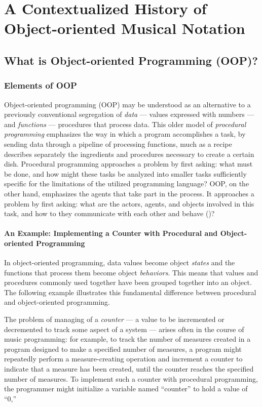 \chapter{A Contextualized History of Object-oriented Musical Notation}
\section{What is Object-oriented Programming (OOP)?}
\subsection{Elements of OOP}

Object-oriented programming (OOP) may be understood as an alternative to a previously conventional segregation of \emph{data} --- values expressed with numbers --- and \emph{functions} --- procedures that process data. This older model of \emph{procedural programming} emphasizes the way in which a program accomplishes a task, by sending data through a pipeline of processing functions, much as a recipe describes separately the ingredients and procedures necessary to create a certain dish. Procedural programming approaches a problem by first asking: what must be done, and how might these tasks be analyzed into smaller tasks sufficiently specific for the limitations of the utilized programming language? OOP, on the other hand, emphasizes the agents that take part in the process. It approaches a problem by first asking: what are the actors, agents, and objects involved in this task, and how to they communicate with each other and behave (\cite[5]{Wirfs-Brock:1990ys})?

\subsubsection{An Example: Implementing a Counter with Procedural and Object-oriented Programming}
In object-oriented programming, data values become object \emph{states} and the functions that process them become object \emph{behaviors}. This means that values and procedures commonly used together have been grouped together into an object. The following example illustrates this fundamental difference between procedural and object-oriented programming.

The problem of managing of a \emph{counter} --- a value to be incremented or decremented to track some aspect of a system --- arises often in the course of music programming: for example, to track the number of measures created in a program designed to make a specified number of measures, a program might repeatedly perform a measure-creating operation and increment a counter to indicate that a measure has been created, until the counter reaches the specified number of measures. To implement such a counter with procedural programming, the programmer might initialize a variable named ``counter'' to hold a value of ``0,''

